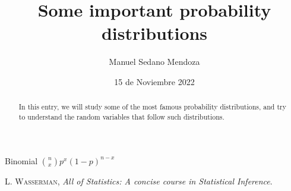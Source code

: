 \documentclass{article}
\title{Some important probability distributions}
\author{Manuel Sedano Mendoza}
\date{15 de Noviembre 2022}
\begin{document}
\maketitle
\begin{abstract}
In this entry, we will study some of the most famous probability distributions, and try to understand the random variables that follow such distributions.
\end{abstract}


Binomial ${n \choose x} p^x(1-p)^{n-x}$

\begin{thebibliography}{}
 \textsc{L. Wasserman}, \textit{All of Statistics: A concise course in Statistical Inference}. 


\end{thebibliography}
\end{document}
